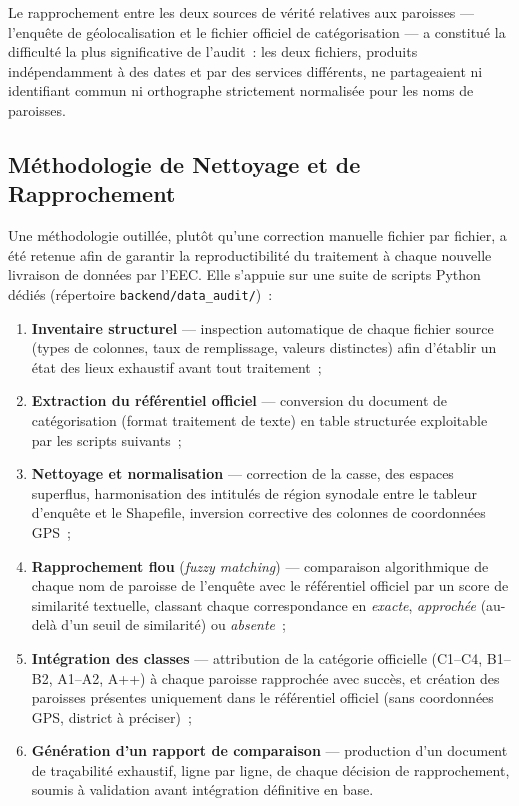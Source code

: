 \documentclass[12pt, a4paper]{report}
\begin{document}
Le rapprochement entre les deux sources de vérité relatives aux
paroisses --- l'enquête de géolocalisation et le fichier officiel de
catégorisation --- a constitué la difficulté la plus significative de
l'audit~: les deux fichiers, produits indépendamment à des dates et par des
services différents, ne partageaient ni identifiant commun ni orthographe
strictement normalisée pour les noms de paroisses.

\subsection{Méthodologie de Nettoyage et de Rapprochement}

Une méthodologie outillée, plutôt qu'une correction manuelle fichier par
fichier, a été retenue afin de garantir la reproductibilité du traitement à
chaque nouvelle livraison de données par l'EEC. Elle s'appuie sur une suite
de scripts Python dédiés (répertoire \texttt{backend/data\_audit/})~:
\begin{enumerate}[itemsep=2pt, topsep=4pt, leftmargin=1.5cm]
  \item \textbf{Inventaire structurel} --- inspection automatique de chaque
    fichier source (types de colonnes, taux de remplissage, valeurs
    distinctes) afin d'établir un état des lieux exhaustif avant tout
    traitement~;
  \item \textbf{Extraction du référentiel officiel} --- conversion du
    document de catégorisation (format traitement de texte) en table
    structurée exploitable par les scripts suivants~;
  \item \textbf{Nettoyage et normalisation} --- correction de la casse, des
    espaces superflus, harmonisation des intitulés de région synodale entre
    le tableur d'enquête et le Shapefile, inversion corrective des colonnes
    de coordonnées GPS~;
  \item \textbf{Rapprochement flou} (\textit{fuzzy matching}) --- comparaison
    algorithmique de chaque nom de paroisse de l'enquête avec le référentiel
    officiel par un score de similarité textuelle, classant chaque
    correspondance en \textit{exacte}, \textit{approchée} (au-delà d'un
    seuil de similarité) ou \textit{absente}~;
  \item \textbf{Intégration des classes} --- attribution de la catégorie
    officielle (C1--C4, B1--B2, A1--A2, A++) à chaque paroisse rapprochée
    avec succès, et création des paroisses présentes uniquement dans le
    référentiel officiel (sans coordonnées GPS, district à préciser)~;
  \item \textbf{Génération d'un rapport de comparaison} --- production d'un
    document de traçabilité exhaustif, ligne par ligne, de chaque décision
    de rapprochement, soumis à validation avant intégration définitive en
    base.
\end{enumerate}
\end{document}
